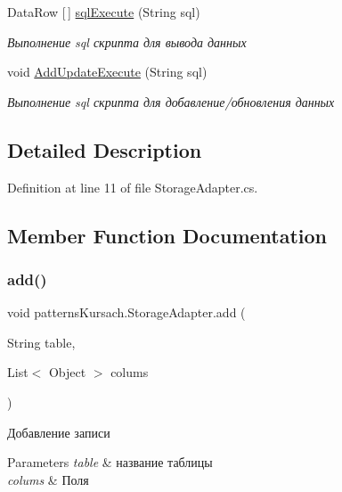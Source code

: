 \begin{DoxyCompactItemize}
Data\+Row \mbox{[}$\,$\mbox{]} \mbox{\hyperlink{classpatterns_kursach_1_1_storage_adapter_a6ad39a4e1cc12887ba0f3f8563032c6d}{sql\+Execute}} (String sql)
\begin{DoxyCompactList}\small\item\em Выполнение sql скрипта для вывода данных \end{DoxyCompactList}\item 
void \mbox{\hyperlink{classpatterns_kursach_1_1_storage_adapter_a45d79830f42e8ba2341425175559b31b}{Add\+Update\+Execute}} (String sql)
\begin{DoxyCompactList}\small\item\em Выполнение sql скрипта для добавление/обновления данных \end{DoxyCompactList}\end{DoxyCompactItemize}


\subsection{Detailed Description}


Definition at line 11 of file Storage\+Adapter.\+cs.



\subsection{Member Function Documentation}
\mbox{\label{classpatterns_kursach_1_1_storage_adapter_a1a6b043621bfa53482563397597aa046}} 
\subsubsection{\texorpdfstring{add()}{add()}}
{\footnotesize\ttfamily void patterns\+Kursach.\+Storage\+Adapter.\+add (\begin{DoxyParamCaption}\item[{String}]{table,  }\item[{List$<$ Object $>$}]{colums }\end{DoxyParamCaption})}



Добавление записи 


\begin{DoxyParams}{Parameters}
{\em table} & название таблицы\\
\hline
{\em colums} & Поля\\
\hline
\end{DoxyParams}


